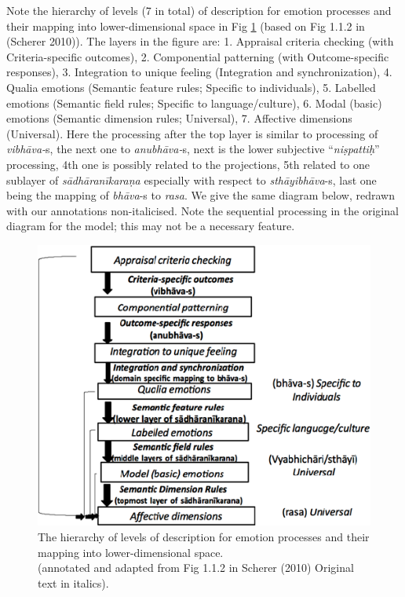 Note the hierarchy of levels (7 in total) of description for emotion processes and their mapping into lower-dimensional space in Fig \ref{chap3-fig1} (based on Fig 1.1.2 in (Scherer 2010)). The layers in the figure are: 1. Appraisal criteria checking (with Criteria-specific outcomes), 2. Componential patterning (with Outcome-specific responses), 3. Integration to unique feeling (Integration and synchronization), 4. Qualia emotions (Semantic feature rules; Specific to individuals), 5. Labelled emotions (Semantic field rules; Specific to language/culture), 6. Modal (basic) emotions (Semantic dimension rules; Universal), 7. Affective dimensions (Universal). Here the processing after the top layer is similar to processing of \textsl{vibhāva-}s, the next one to \textsl{anubhāva-}s, next is the lower subjective “\textsl{niṣpattiḥ}” processing, 4th one is possibly related to the projections, 5th related to one sublayer of \textsl{sādhāranīkaraṇa} especially with respect to \textsl{sthāyibhāva}-s, last one being the mapping of \textsl{bhāva}-s to \textsl{rasa}. We give the same diagram below, redrawn with our annotations non-italicised. Note the sequential processing in the original diagram for the model; this may not be a necessary feature. 

\begin{figure}[H]
\centering
\includegraphics[scale=.9]{figures/3.eps}
\caption{The hierarchy of levels of description for emotion processes and their mapping into lower-dimensional space.\\
(annotated and adapted from Fig 1.1.2 in Scherer (2010) Original text in italics).}\label{chap3-fig1}
\end{figure}

